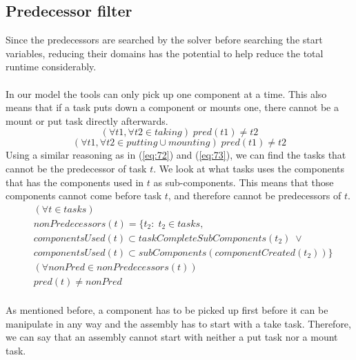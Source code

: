   
  
  \subsection{Predecessor filter}
  Since the predecessors are searched by the solver before searching the start variables, reducing their domains has the potential to help reduce the total runtime considerably.
 \\\\
  In our model the tools can only pick up one component at a time. This also means that if a task puts down a component or mounts one, there cannot be a mount or put task directly afterwards.
  \begin{equation}\label{eq:75}
  (\forall t1, \forall t2 \in taking) \; pred(t1) \neq t2
  \end{equation}
  \begin{equation}\label{eq:76}
  (\forall t1, \forall t2 \in putting \cup mounting) \; pred(t1) \neq t2
  \end{equation}
\newpage
   \noindent Using a similar reasoning as in (\ref{eq:72}) and (\ref{eq:73}), we can find the tasks that cannot be the predecessor of task $t$. We look at what tasks uses the components that has the components used in $t$ as sub-components. This means that those components cannot come before task $t$, and therefore cannot be predecessors of $t$.
  \begin{equation}
  \begin{aligned}\label{eq:78}
  &(\forall t \in tasks)\\
  &nonPredecessors(t) = \{t_2 : \; t_2 \in tasks, \\
  &componentsUsed(t) \subset taskCompleteSubComponents(t_2) \; \lor \\
  &componentsUsed(t) \subset subComponents(componentCreated(t_2))\} \\
  &(\forall nonPred \in nonPredecessors(t)) \\
  &pred(t) \neq nonPred \\
  \end{aligned}
  \end{equation}

   \noindent As mentioned before, a component has to be picked up first before it can be manipulate in any way and the assembly has to start with a take task. Therefore, we can say that an assembly cannot start with neither a put task nor a mount task.
    
